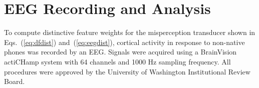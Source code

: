\section{EEG Recording and Analysis}
\label{sec:methods_eeg}

To compute distinctive feature weights for the misperception
transducer shown in Eqs.~(\ref{eq:dfdist}) and~(\ref{eq:eegdist}),
cortical activity in response to non-native phones was recorded by
an EEG. Signals were acquired using a BrainVision actiCHamp 
system with 64 channels and 1000 Hz sampling frequency.
All procedures were approved by the University of Washington Institutional
Review Board.

